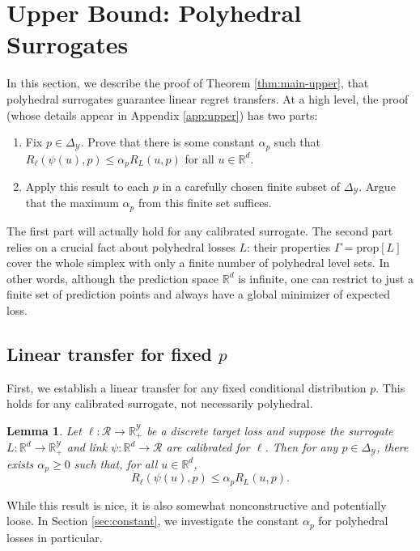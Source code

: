 \documentclass{article}
\newtheorem{lemma}{Lemma}
\theoremstyle{definition}\newtheorem{definition}{Definition}
\theoremstyle{definition}\newtheorem{assumption}{Assumption}
\newcommand{\reals}{\mathbb{R}}
\newcommand{\prop}[1]{\mathrm{prop}[#1]}
\newcommand{\simplex}{\Delta_\Y}
\newcommand{\R}{\mathcal{R}}
\newcommand{\Y}{\mathcal{Y}}
\begin{document}


\section{Upper Bound: Polyhedral Surrogates} \label{sec:upper}
In this section, we describe the proof of Theorem \ref{thm:main-upper}, that polyhedral surrogates guarantee linear regret transfers.
At a high level, the proof (whose details appear in Appendix \ref{app:upper}) has two parts:
\begin{enumerate}
  \item Fix $p \in \simplex$.
        Prove that there is some constant $\alpha_p$ such that $R_{\ell}(\psi(u),p) \leq \alpha_p R_L(u,p)$ for all $u\in\reals^d$.
      \item Apply this result to each $p$ in a carefully chosen finite subset of $\simplex$.
        Argue that the maximum $\alpha_p$ from this finite set suffices.
\end{enumerate}
The first part will actually hold for any calibrated surrogate.
The second part relies on a crucial fact about polyhedral losses $L$: their properties $\Gamma=\prop{L}$ cover the whole simplex with only a finite number of polyhedral level sets.
In other words, although the prediction space $\reals^d$ is infinite, one can restrict to just a finite set of prediction points and always have a global minimizer of expected loss.

\subsection{Linear transfer for fixed $p$}
First, we establish a linear transfer for any fixed conditional distribution $p$.
This holds for any calibrated surrogate, not necessarily polyhedral.
\begin{lemma} \label{lemma:fixed-p}
  Let $\ell: \R \to \reals_+^{\Y}$ be a discrete target loss and suppose the surrogate $L: \reals^d \to \reals_+^{\Y}$ and link $\psi: \reals^d \to \R$ are calibrated for $\ell$.
  Then for any $p \in \simplex$, there exists $\alpha_p \geq 0$ such that, for all $u \in \reals^d$,
    \[ R_{\ell}(\psi(u),p) \leq \alpha_p R_L(u,p) . \]
\end{lemma}
While this result is nice, it is also somewhat nonconstructive and potentially loose.
In Section \ref{sec:constant}, we investigate the constant $\alpha_p$ for polyhedral losses in particular.
\end{document}

